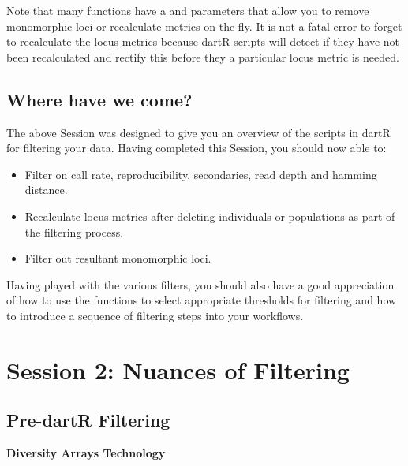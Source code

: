 \documentclass[
  letterpaper,
  DIV=11,
  numbers=noendperiod]{scrreprt}
\providecommand{\tightlist}{%
  \setlength{\itemsep}{0pt}\setlength{\parskip}{0pt}}\usepackage{longtable,booktabs,array}
\let\textttOrig\texttt
\renewcommand{\texttt}[1]{\textttOrig{\color{blue}{#1}}}
\begin{document}
Note that many functions have a \texttt{mono.rm} and \texttt{recalc}
parameters that allow you to remove monomorphic loci or recalculate
metrics on the fly. It is not a fatal error to forget to recalculate the
locus metrics because dartR scripts will detect if they have not been
recalculated and rectify this before they a particular locus metric is
needed.

\hypertarget{where-have-we-come}{%
\subsection{Where have we come?}\label{where-have-we-come}}

The above Session was designed to give you an overview of the scripts in
dartR for filtering your data. Having completed this Session, you should
now able to:

\begin{itemize}
\tightlist
\item
  Filter on call rate, reproducibility, secondaries, read depth and
  hamming distance.
\item
  Recalculate locus metrics after deleting individuals or populations as
  part of the filtering process.
\item
  Filter out resultant monomorphic loci.
\end{itemize}

Having played with the various filters, you should also have a good
appreciation of how to use the \texttt{gl.report} functions to select
appropriate thresholds for filtering and how to introduce a sequence of
filtering steps into your workflows.

\hypertarget{session-2-nuances-of-filtering}{%
\section{Session 2: Nuances of
Filtering}\label{session-2-nuances-of-filtering}}

\hypertarget{pre-dartr-filtering}{%
\subsection{Pre-dartR Filtering}\label{pre-dartr-filtering}}

\textbf{Diversity Arrays Technology}
\end{document}
